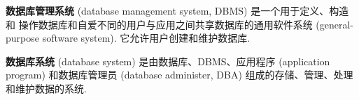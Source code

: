 \documentclass[10pt,UTF8]{book} %
\begin{document}
\textbf{数据库管理系统} (database management system, DBMS) 是一个用于定义、构造和
操作数据库和自爱不同的用户与应用之间共享数据库的通用软件系统
(general-purpose software system). 它允许用户创建和维护数据库.

\textbf{数据库系统} (database system) 是由数据库、DBMS、应用程序 (application program)
和数据库管理员 (database administer, DBA) 组成的存储、管理、处理和维护数据的系统.
\end{document}

